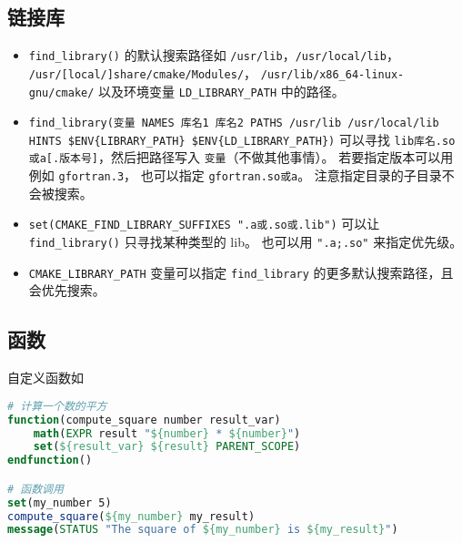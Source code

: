 \subsection{链接库}
\begin{itemize}
\item \verb`find_library()` 的默认搜索路径如 \verb`/usr/lib`，\verb`/usr/local/lib`， \verb`/usr/[local/]share/cmake/Modules/`， \verb`/usr/lib/x86_64-linux-gnu/cmake/` 以及环境变量 \verb`LD_LIBRARY_PATH` 中的路径。
\item \verb`find_library(变量 NAMES 库名1 库名2 PATHS /usr/lib /usr/local/lib HINTS $ENV{LIBRARY_PATH} $ENV{LD_LIBRARY_PATH})` 可以寻找 \verb`lib库名.so或a[.版本号]`，然后把路径写入 \verb`变量`（不做其他事情）。 若要指定版本可以用例如 \verb`gfortran.3`， 也可以指定 \verb`gfortran.so或a`。 注意指定目录的子目录不会被搜索。
\item \verb`set(CMAKE_FIND_LIBRARY_SUFFIXES ".a或.so或.lib")` 可以让 \verb`find_library()` 只寻找某种类型的 lib。 也可以用 \verb`".a;.so"` 来指定优先级。
\item \verb`CMAKE_LIBRARY_PATH` 变量可以指定 \verb`find_library` 的更多默认搜索路径，且会优先搜索。
\end{itemize}

\subsection{函数}
自定义函数如
\begin{lstlisting}[language=cmake]
# 计算一个数的平方
function(compute_square number result_var)
    math(EXPR result "${number} * ${number}")
    set(${result_var} ${result} PARENT_SCOPE)
endfunction()

# 函数调用
set(my_number 5)
compute_square(${my_number} my_result)
message(STATUS "The square of ${my_number} is ${my_result}")
\end{lstlisting}


